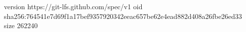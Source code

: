 version https://git-lfs.github.com/spec/v1
oid sha256:764541e7d69f1a17bef9357920342eeac657be62e4ead882d408a26fbe26ed33
size 262240
